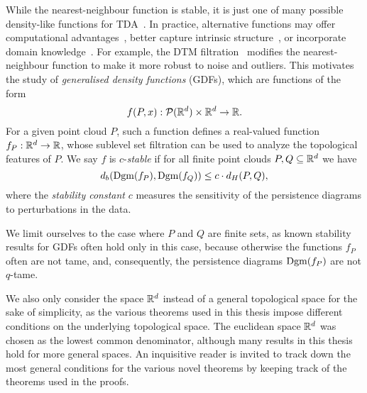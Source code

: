 While the nearest-neighbour function is stable, it is just one of many possible
density-like functions for
TDA~\cite{anai2020dtm,hoefgeest2022christoffeldarbouxkerneltopologicaldata,phillips2015geometricinferencekerneldensity}.
In practice, alternative functions may offer computational
advantages~\cite{guibas2011witnessed,buchet2014efficientrobustpersistenthomology},
better capture intrinsic structure~\cite{anai2020dtm}, or incorporate domain
knowledge~\cite{fractalfract8120731}. For example, the DTM
filtration~\cite{anai2020dtm} modifies the nearest-neighbour function to make
it more robust to noise and outliers. This motivates the study of
\emph{generalised density functions} (GDFs), which are functions of the form
\begin{equation}
    f(P, x) : \mathcal{P}(\mathbb{R}^d) \times \mathbb{R}^d \to \mathbb{R}.
\end{equation}
For a given point cloud $P$, such a function defines a real-valued function
$f_P: \mathbb{R}^d \to \mathbb{R}$, whose sublevel set filtration can be used to analyze the
topological features of $P$. We say $f$ is $c$-\emph{stable} if for all finite
point clouds $P, Q \subseteq \mathbb{R}^d$ we have
\begin{equation}
    d_b(\operatorname{Dgm}(f_P), \operatorname{Dgm}(f_Q)) \leq c \cdot d_H(P, Q),
\end{equation}
where the \emph{stability constant} $c$ measures the sensitivity of the
persistence diagrams to perturbations in the data.

We limit ourselves to the case where $P$ and $Q$ are finite sets, as known
stability results for GDFs often hold only in this case, because otherwise the
functions $f_P$ often are not tame, and, consequently, the persistence diagrams
$\operatorname{Dgm}(f_P)$ are not $q$-tame.

We also only consider the space $\mathbb{R}^d$ instead of a general topological space
for the sake of simplicity, as the various theorems used in this thesis impose
different conditions on the underlying topological space. The euclidean space
$\mathbb{R}^d$ was chosen as the lowest common denominator, although many results in
this thesis hold for more general spaces. An inquisitive reader is invited to
track down the most general conditions for the various novel theorems by keeping
track of the theorems used in the proofs.


